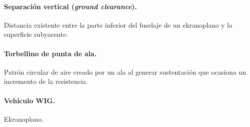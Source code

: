 \paragraph{Separación vertical (\emph{ground clearance}).} Distancia existente entre la parte inferior del fuselaje de un ekranoplano y la superficie subyacente.

\paragraph{Torbellino de punta de ala.} Patrón circular de aire creado por un ala al generar sustentación que ocasiona un incremento de la resistencia.

\paragraph{Vehículo WIG.} Ekranoplano.


